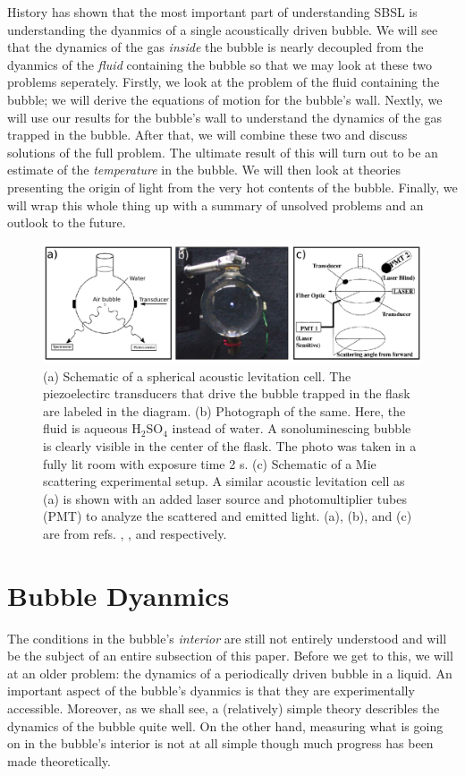 \documentclass[rmp,aps,nofootinbib,superscriptaddress,floatfix]{revtex4-2}
\begin{document}
History has shown that the most important part of understanding SBSL is understanding the dyanmics of a single acoustically driven bubble. We will see that the dynamics of the gas \emph{inside} the bubble is nearly decoupled from the dyanmics of the \emph{fluid} containing the bubble so that we may look at these two problems seperately. Firstly, we look at the problem of the fluid containing the bubble; we will derive the equations of motion for the bubble's wall. Nextly, we will use our results for the bubble's wall to understand the dynamics of the gas trapped in the bubble. After that, we will combine these two and discuss solutions of the full problem. The ultimate result of this will turn out to be an estimate of the \emph{temperature} in the bubble. We will then look at theories presenting the origin of light from the very hot contents of the bubble. Finally, we will wrap this whole thing up with a summary of unsolved problems and an outlook to the future.

\begin{figure}
\includegraphics[width=0.9\linewidth]{figs/flask.pdf}
    \caption{(a) Schematic of a spherical acoustic levitation cell. The piezoelectirc transducers that drive the bubble trapped in the flask are labeled in the diagram. (b) Photograph of the same. Here, the fluid is aqueous H$_2$SO$_4$ instead of water. A sonoluminescing bubble is clearly visible in the center of the flask. The photo was taken in a fully lit room with exposure time 2 s. (c) Schematic of a Mie scattering experimental setup. A similar acoustic levitation cell as (a) is shown with an added laser source and photomultiplier tubes (PMT) to analyze the scattered and emitted light. (a), (b), and (c) are from refs. \cite{brenner2002single}, \cite{suslick2008inside}, and \cite{gompf2000mie} respectively.}
\label{fig:flask}
\end{figure}


\section{Bubble Dyanmics}
The conditions in the bubble's \emph{interior} are still not entirely understood and will be the subject of an entire subsection of this paper. Before we get to this, we will at an older problem: the dynamics of a periodically driven bubble in a liquid. An important aspect of the bubble's dyanmics is that they are experimentally accessible. Moreover, as we shall see, a (relatively) simple theory describles the dynamics of the bubble quite well. On the other hand, measuring what is going on in the bubble's interior is not at all simple though much progress has been made theoretically. 
 
\end{document}
